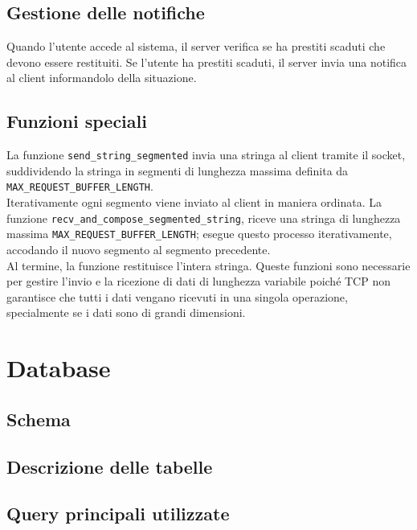 \documentclass[]{report}
\begin{document}
\section{Gestione delle notifiche}
Quando l'utente accede al sistema, il server verifica se ha prestiti scaduti che devono essere restituiti. Se l'utente ha prestiti scaduti, il server invia una notifica al client informandolo della situazione.

\section{Funzioni speciali}
La funzione \texttt{send\_string\_segmented} invia una stringa al client tramite il socket, suddividendo la stringa in segmenti di lunghezza massima definita da \texttt{MAX\_REQUEST\_BUFFER\_LENGTH}.\\
Iterativamente ogni segmento viene inviato al client in maniera ordinata. \meskip
La funzione \texttt{recv\_and\_compose\_segmented\_string}, riceve una stringa di lunghezza \\ massima \texttt{MAX\_REQUEST\_BUFFER\_LENGTH}; esegue questo processo iterativamente, accodando il nuovo segmento al segmento precedente.\\
Al termine, la funzione restituisce l'intera stringa.\bskip
Queste funzioni sono necessarie per gestire l'invio e la ricezione di dati di lunghezza variabile poiché TCP non garantisce che tutti i dati vengano ricevuti in una singola operazione, specialmente se i dati sono di grandi dimensioni.


\chapter{Database}
\section{Schema}

\section{Descrizione delle tabelle}
\section{Query principali utilizzate}
\end{document}
